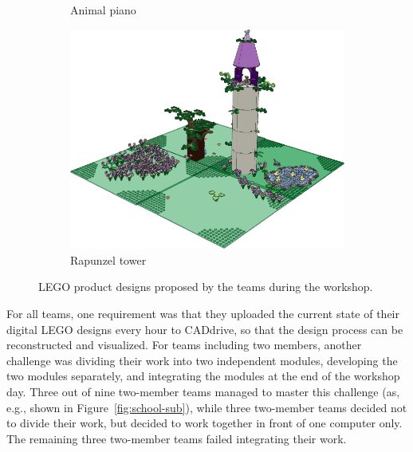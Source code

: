 \documentclass{PDS}
\begin{document}
\begin{figure}[htbp]
\begin{subfigure}[b]{0.21\textwidth}
        \caption{Animal piano}
        \label{fig:piano}
    \end{subfigure}
    \hspace{0.05\textwidth}
    \begin{subfigure}[b]{0.21\textwidth}
        \includegraphics[width=\textwidth]{./figures/rapunzel.png}
        \caption{Rapunzel tower}
        \label{fig:rapunzel}
    \end{subfigure}
    \caption{LEGO product designs proposed by the teams during the workshop.}
    \label{fig:kinderuni}
\end{figure}

For all teams, one requirement was that they uploaded the current state of their digital LEGO designs every hour to CADdrive, so that the design process can be reconstructed and visualized.
For teams including two members, another challenge was dividing their work into two independent modules, developing the two modules separately, and integrating the modules at the end of the workshop day.
Three out of nine two-member teams managed to master this challenge (as, e.g., shown in Figure~\ref{fig:school-sub}), while three two-member teams decided not to divide their work, but decided to work together in front of one computer only.
The remaining three two-member teams failed integrating their work.
\end{document}
